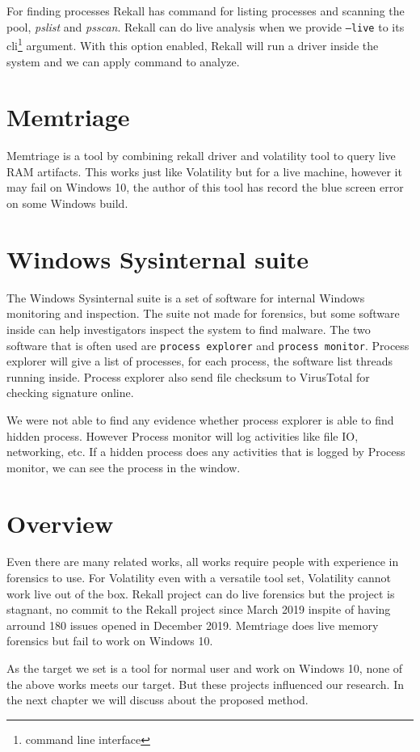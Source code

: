 For finding processes Rekall has command for listing processes and scanning the pool, \textit{pslist} and \textit{psscan}. Rekall can do live analysis when we provide \texttt{--live} to its cli\footnote{command line interface} argument. With this option enabled, Rekall will run a driver inside the system and we can apply command to analyze.

\section[Memtriage]{Memtriage}

Memtriage \cite{memtriage} is a tool by combining rekall driver and volatility tool to query live RAM artifacts. This works just like Volatility but for a live machine, however it may fail on Windows 10, the author of this tool has record the blue screen error on some Windows build.

\section[Windows Sysinternal suite]{Windows Sysinternal suite}

The Windows Sysinternal \cite{sysinternal} suite is a set of software for internal Windows monitoring and inspection. The suite not made for forensics, but some software inside can help investigators inspect the system to find malware. The two software that is often used are \texttt{process explorer} and \texttt{process monitor}. Process explorer will give a list of processes, for each process, the software list threads running inside. Process explorer also send file checksum to VirusTotal for checking signature online.

We were not able to find any evidence whether process explorer is able to find hidden process. However Process monitor will log activities like file IO, networking, etc. If a hidden process does any activities that is logged by Process monitor, we can see the process in the window.

\section[Overview]{Overview}

Even there are many related works, all works require people with experience in forensics to use. For Volatility even with a versatile tool set, Volatility cannot work live out of the box. Rekall project can do live forensics but the project is stagnant, no commit to the Rekall project since March 2019 inspite of having arround 180 issues opened in December 2019. Memtriage does live memory forensics but fail to work on Windows 10.

As the target we set is a tool for normal user and work on Windows 10, none of the above works meets our target. But these projects influenced our research. In the next chapter we will discuss about the proposed method.

